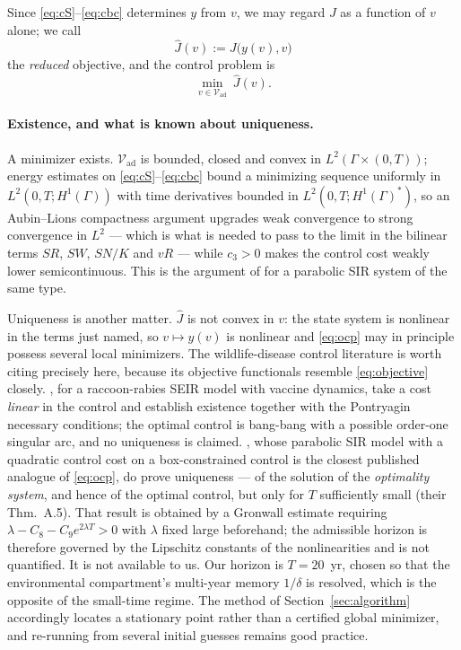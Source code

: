 \documentclass[11pt]{article}
\newcommand{\Vad}{\mathcal{V}_{\mathrm{ad}}}
\begin{document}
Since \eqref{eq:cS}--\eqref{eq:cbc} determines $y$ from $v$, we may regard $J$ as a function of $v$ alone; we call
\begin{equation}
\hat J(v) := J\big(y(v),v\big)
\end{equation}
the \emph{reduced} objective, and the control problem is
\begin{equation}
\min_{v\in\Vad}\ \hat J(v).
\label{eq:ocp}
\end{equation}
\paragraph{Existence, and what is known about uniqueness.} A minimizer exists. $\Vad$ is bounded, closed and convex in $L^2(\Gamma\times(0,T))$; energy estimates on \eqref{eq:cS}--\eqref{eq:cbc} bound a minimizing sequence uniformly in $L^2(0,T;H^1(\Gamma))$ with time derivatives bounded in $L^2(0,T;H^1(\Gamma)^*)$, so an Aubin--Lions compactness argument upgrades weak convergence to strong convergence in $L^2$ --- which is what is needed to pass to the limit in the bilinear terms $SR$, $SW$, $SN/K$ and $vR$ --- while $c_3>0$ makes the control cost weakly lower semicontinuous. This is the argument of \citet[Thm.~A.2]{Neilan2011} for a parabolic SIR system of the same type.

Uniqueness is another matter. $\hat J$ is not convex in $v$: the state system is nonlinear in the terms just named, so $v\mapsto y(v)$ is nonlinear and \eqref{eq:ocp} may in principle possess several local minimizers. The wildlife-disease control literature is worth citing precisely here, because its objective functionals resemble \eqref{eq:objective} closely. \citet{Clayton2010}, for a raccoon-rabies SEIR model with vaccine dynamics, take a cost \emph{linear} in the control and establish existence together with the Pontryagin necessary conditions; the optimal control is bang-bang with a possible order-one singular arc, and no uniqueness is claimed. \citet{Neilan2011}, whose parabolic SIR model with a quadratic control cost on a box-constrained control is the closest published analogue of \eqref{eq:ocp}, do prove uniqueness --- of the solution of the \emph{optimality system}, and hence of the optimal control, but only for $T$ sufficiently small (their Thm.~A.5). That result is obtained by a Gronwall estimate requiring $\lambda - C_8 - C_9e^{2\lambda T}>0$ with $\lambda$ fixed large beforehand; the admissible horizon is therefore governed by the Lipschitz constants of the nonlinearities and is not quantified. It is not available to us. Our horizon is $T=20$~yr, chosen so that the environmental compartment's multi-year memory $1/\delta$ is resolved, which is the opposite of the small-time regime. The method of Section~\ref{sec:algorithm} accordingly locates a stationary point rather than a certified global minimizer, and re-running from several initial guesses remains good practice.
\end{document}
